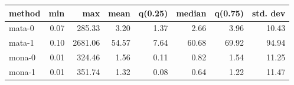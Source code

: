 \begin{tabular}{lrrrrrrr}
\hline
 method   &   min &     max &   mean &   q(0.25) &   median &   q(0.75) &   std. dev \\
\hline
 mata-0   &  0.07 &  285.33 &   3.20 &      1.37 &     2.66 &      3.96 &      10.43 \\
 mata-1   &  0.10 & 2681.06 &  54.57 &      7.64 &    60.68 &     69.92 &      94.94 \\
 mona-0   &  0.01 &  324.46 &   1.56 &      0.11 &     0.82 &      1.54 &      11.25 \\
 mona-1   &  0.01 &  351.74 &   1.32 &      0.08 &     0.64 &      1.22 &      11.47 \\
\hline
\end{tabular}
